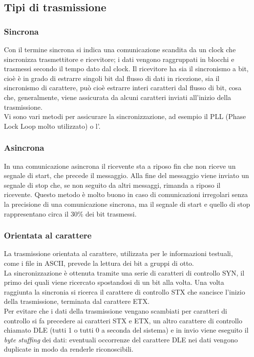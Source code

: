 \documentclass[a4paper,11pt]{article}
\def\sub#1{\subsection{#1}\label{#1}}
\def\subsub#1{\subsubsection{#1}\label{#1}}
\def\vedi#1{\nameref{#1}}
\def\italic#1{\textit{#1}}
\begin{document}
\sub{Tipi di trasmissione}
\subsub{Sincrona}
Con il termine sincrona si indica una comunicazione scandita da un clock che sincronizza trasmettitore e ricevitore; i dati vengono raggruppati in blocchi e trasmessi secondo il tempo dato dal clock. Il ricevitore ha sia il sincronismo a bit, cioè è in grado di estrarre singoli bit dal flusso di dati in ricezione, sia il sincronismo di carattere, può cioè estrarre interi caratteri dal flusso di bit, cosa che, generalmente, viene assicurata da alcuni caratteri inviati all'inizio della trasmissione.\\ Vi sono vari metodi per assicurare la sincronizzazione, ad esempio il PLL (Phase Lock Loop molto utilizzato) o l'\vedi{AMI}.
\subsub{Asincrona}
In una comunicazione asincrona il ricevente sta a riposo fin che non riceve un segnale di start, che precede il messaggio. Alla fine del messaggio viene inviato un segnale di stop che, se non seguito da altri messaggi, rimanda a riposo il ricevente. Questo metodo è molto buono in caso di comunicazioni irregolari senza la precisione di una comunicazione sincrona, ma il segnale di start e quello di stop rappresentano circa il $30\%$ dei bit trasmessi.  
\subsub{Orientata al carattere}
La trasmissione orientata al carattere, utilizzata per le informazioni testuali, come i file in ASCII, prevede la lettura dei bit a gruppi di otto. \\La sincronizzazione è ottenuta tramite una serie di caratteri di controllo SYN, il primo dei quali viene ricercato spostandosi di un bit alla volta.
Una volta raggiunta la sincronia si ricerca il carattere di controllo STX che sancisce l'inizio della trasmissione, terminata dal carattere ETX.\\ Per evitare che i dati della trasmissione vengano scambiati per caratteri di controllo si fa precedere ai caratteri STX e ETX, un altro carattere di controllo chiamato DLE (tutti 1 o tutti 0 a seconda del sistema) e in invio viene eseguito il \italic{byte stuffing} dei dati: eventuali occorrenze del carattere DLE nei dati vengono duplicate in modo da renderle riconoscibili.   
\end{document}

